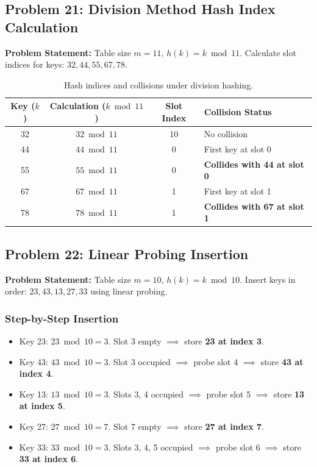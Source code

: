 \subsection{Problem 21: Division Method Hash Index Calculation}

\textbf{Problem Statement:} Table size $m = 11$, $h(k) = k \bmod 11$. Calculate slot indices for keys: $32, 44, 55, 67, 78$.

\begin{table}[htbp]
\centering
\small
\begin{tabular}{c c c l}
\toprule
\textbf{Key ($k$)} & \textbf{Calculation ($k \bmod 11$)} & \textbf{Slot Index} & \textbf{Collision Status} \\
\midrule
32 & $32 \bmod 11$ & 10 & No collision \\
44 & $44 \bmod 11$ & 0  & First key at slot 0 \\
55 & $55 \bmod 11$ & 0  & \textbf{Collides with 44 at slot 0} \\
67 & $67 \bmod 11$ & 1  & First key at slot 1 \\
78 & $78 \bmod 11$ & 1  & \textbf{Collides with 67 at slot 1} \\
\bottomrule
\end{tabular}
\caption{Hash indices and collisions under division hashing.}
\end{table}

\subsection{Problem 22: Linear Probing Insertion}

\textbf{Problem Statement:} Table size $m = 10$, $h(k) = k \bmod 10$. Insert keys in order: $23, 43, 13, 27, 33$ using linear probing.

\subsubsection*{Step-by-Step Insertion}
\begin{itemize}
    \item Key 23: $23 \bmod 10 = 3$. Slot 3 empty $\implies$ store \textbf{23 at index 3}.
    \item Key 43: $43 \bmod 10 = 3$. Slot 3 occupied $\implies$ probe slot 4 $\implies$ store \textbf{43 at index 4}.
    \item Key 13: $13 \bmod 10 = 3$. Slots 3, 4 occupied $\implies$ probe slot 5 $\implies$ store \textbf{13 at index 5}.
    \item Key 27: $27 \bmod 10 = 7$. Slot 7 empty $\implies$ store \textbf{27 at index 7}.
    \item Key 33: $33 \bmod 10 = 3$. Slots 3, 4, 5 occupied $\implies$ probe slot 6 $\implies$ store \textbf{33 at index 6}.
\end{itemize}

